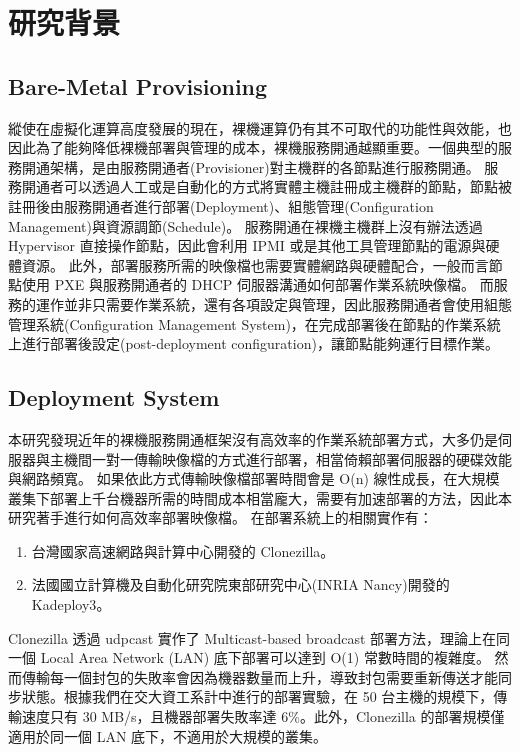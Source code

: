 \chapter{研究背景}
\section{Bare-Metal Provisioning}
縱使在虛擬化運算高度發展的現在，裸機運算仍有其不可取代的功能性與效能，也因此為了能夠降低裸機部署與管理的成本，裸機服務開通越顯重要。一個典型的服務開通架構，是由服務開通者(Provisioner)對主機群的各節點進行服務開通。
服務開通者可以透過人工或是自動化的方式將實體主機註冊成主機群的節點，節點被註冊後由服務開通者進行部署(Deployment)、組態管理(Configuration Management)與資源調節(Schedule)。
服務開通在裸機主機群上沒有辦法透過 Hypervisor 直接操作節點，因此會利用 IPMI 或是其他工具管理節點的電源與硬體資源。
此外，部署服務所需的映像檔也需要實體網路與硬體配合，一般而言節點使用 PXE 與服務開通者的 DHCP 伺服器溝通如何部署作業系統映像檔。
而服務的運作並非只需要作業系統，還有各項設定與管理，因此服務開通者會使用組態管理系統(Configuration Management System)，在完成部署後在節點的作業系統上進行部署後設定(post-deployment configuration)，讓節點能夠運行目標作業。


\section{Deployment System}
本研究發現近年的裸機服務開通框架\cite{chandrasekar2014comparative}沒有高效率的作業系統部署方式，大多仍是伺服器與主機間一對一傳輸映像檔的方式進行部署，相當倚賴部署伺服器的硬碟效能與網路頻寬。
如果依此方式傳輸映像檔部署時間會是 O(n) 線性成長，在大規模叢集下部署上千台機器所需的時間成本相當龐大，需要有加速部署的方法，因此本研究著手進行如何高效率部署映像檔。
在部署系統上的相關實作有：

\begin{enumerate}
\item 台灣國家高速網路與計算中心開發的 Clonezilla\cite{shiau2008clonezilla}。
\item 法國國立計算機及自動化研究院東部研究中心(INRIA Nancy)開發的 Kadeploy3\cite{kadeploy3}。
\end{enumerate}


Clonezilla 透過 udpcast 實作了 Multicast-based broadcast 部署方法，理論上在同一個 Local Area Network (LAN) 底下部署可以達到 O(1) 常數時間的複雜度。
然而傳輸每一個封包的失敗率會因為機器數量而上升，導致封包需要重新傳送才能同步狀態。根據我們在交大資工系計中進行的部署實驗，在 50 台主機的規模下，傳輸速度只有 30 MB/s，且機器部署失敗率達 6\%。此外，Clonezilla 的部署規模僅適用於同一個 LAN 底下，不適用於大規模的叢集。


